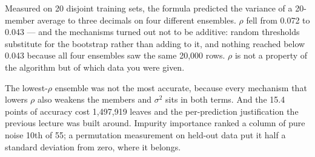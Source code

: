 \documentclass[11pt,a4paper]{article}
\begin{document}
Measured on 20 disjoint training sets, the formula predicted the variance of a
20-member average to three decimals on four different ensembles. $\rho$ fell
from 0.072 to 0.043 --- and the mechanisms turned out not to be additive:
random thresholds substitute for the bootstrap rather than adding to it, and
nothing reached below 0.043 because all four ensembles saw the same 20{,}000
rows. $\rho$ is not a property of the algorithm but of which data you were
given.

The lowest-$\rho$ ensemble was not the most accurate, because every mechanism
that lowers $\rho$ also weakens the members and $\sigma^2$ sits in both terms.
And the 15.4 points of accuracy cost 1{,}497{,}919 leaves and the
per-prediction justification the previous lecture was built around. Impurity
importance ranked a column of pure noise 10th of 55; a permutation measurement
on held-out data put it half a standard deviation from zero, where it belongs.
\end{document}
